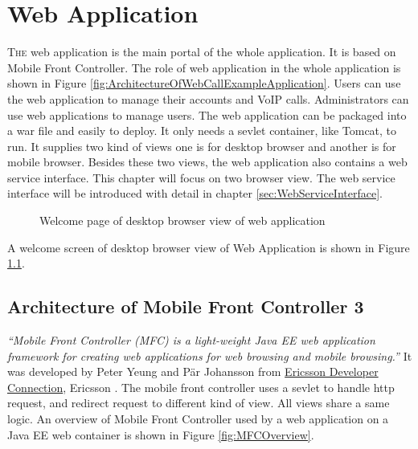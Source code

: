 
\chapter{Web Application}
\label{sec:WebApplication}

\lettrine[lines=3]{T}{he} web application is the main portal of the whole application. It is based on Mobile Front Controller. The role of web application in the whole application is shown in Figure \ref{fig:ArchitectureOfWebCallExampleApplication}. Users can use the web application to manage their accounts and VoIP calls. Administrators can use web applications to manage users. The web application can be packaged into a war file and easily to deploy. It only needs a sevlet container, like Tomcat, to run. It supplies two kind of views one is for desktop browser and another is for mobile browser. Besides these two views, the web application also contains a web service interface. This chapter will focus on two browser view. The web service interface will be introduced with detail in chapter \ref{sec:WebServiceInterface}.

\begin{figure}[!hbtp]
\centering
{}
\caption{Welcome page of desktop browser view of web application}
\label{fig:WelcomePageOfDesktopBrowserView}
\end{figure}

A welcome screen of desktop browser view of Web Application is shown in Figure \ref{fig:WelcomePageOfDesktopBrowserView}.

\section{Architecture of Mobile Front Controller 3}
\label{sec:WebApplication:ArchitectureOfMobileFrontController3}

\textit{``Mobile Front Controller (MFC)\label{sym:MFC} is a light-weight Java EE web application framework for creating web applications for web browsing and mobile browsing.''} \cite{MobileFrontController} It was developed by Peter Yeung and P\"{a}r Johansson from \href{http://www.ericsson.com/developer/}{Ericsson Developer Connection}, Ericsson \cite{MobileFrontController}. The mobile front controller uses a sevlet to handle http request, and redirect request to different kind of view. All views share a same logic. An overview of Mobile Front Controller used by a web application on a Java EE web container is shown in Figure \ref{fig:MFCOverview}.

